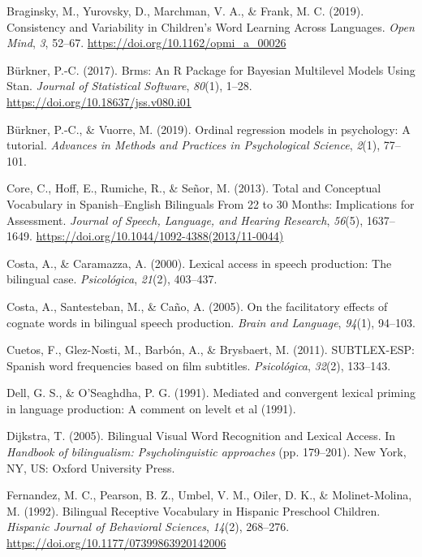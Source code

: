 \documentclass[
  english,
  man,man,floatsintext]{apa6}
\newlength{\cslhangindent}
\newenvironment{cslreferences}%
  {\setlength{\parindent}{0pt}%
  \everypar{\setlength{\hangindent}{\cslhangindent}}\ignorespaces}%
  {\par}
\begin{document}
\begin{cslreferences}
\leavevmode\hypertarget{ref-braginsky_consistency_2019}{}%
Braginsky, M., Yurovsky, D., Marchman, V. A., \& Frank, M. C. (2019). Consistency and Variability in Children's Word Learning Across Languages. \emph{Open Mind}, \emph{3}, 52--67. \url{https://doi.org/10.1162/opmi_a_00026}

\leavevmode\hypertarget{ref-burkner_brms_2017}{}%
Bürkner, P.-C. (2017). Brms: An R Package for Bayesian Multilevel Models Using Stan. \emph{Journal of Statistical Software}, \emph{80}(1), 1--28. \url{https://doi.org/10.18637/jss.v080.i01}

\leavevmode\hypertarget{ref-burkner_ordinal_2019}{}%
Bürkner, P.-C., \& Vuorre, M. (2019). Ordinal regression models in psychology: A tutorial. \emph{Advances in Methods and Practices in Psychological Science}, \emph{2}(1), 77--101.

\leavevmode\hypertarget{ref-core_total_2013}{}%
Core, C., Hoff, E., Rumiche, R., \& Señor, M. (2013). Total and Conceptual Vocabulary in Spanish--English Bilinguals From 22 to 30 Months: Implications for Assessment. \emph{Journal of Speech, Language, and Hearing Research}, \emph{56}(5), 1637--1649. \url{https://doi.org/10.1044/1092-4388(2013/11-0044)}

\leavevmode\hypertarget{ref-costa_lexical_2000}{}%
Costa, A., \& Caramazza, A. (2000). Lexical access in speech production: The bilingual case. \emph{Psicológica}, \emph{21}(2), 403--437.

\leavevmode\hypertarget{ref-costa_facilitatory_2005}{}%
Costa, A., Santesteban, M., \& Caño, A. (2005). On the facilitatory effects of cognate words in bilingual speech production. \emph{Brain and Language}, \emph{94}(1), 94--103.

\leavevmode\hypertarget{ref-cuetos_subtlex-esp_2011}{}%
Cuetos, F., Glez-Nosti, M., Barbón, A., \& Brysbaert, M. (2011). SUBTLEX-ESP: Spanish word frequencies based on film subtitles. \emph{Psicológica}, \emph{32}(2), 133--143.

\leavevmode\hypertarget{ref-dell_mediated_1991}{}%
Dell, G. S., \& O'Seaghdha, P. G. (1991). Mediated and convergent lexical priming in language production: A comment on levelt et al (1991).

\leavevmode\hypertarget{ref-dijkstra_bilingual_2005}{}%
Dijkstra, T. (2005). Bilingual Visual Word Recognition and Lexical Access. In \emph{Handbook of bilingualism: Psycholinguistic approaches} (pp. 179--201). New York, NY, US: Oxford University Press.

\leavevmode\hypertarget{ref-fernandez_bilingual_1992}{}%
Fernandez, M. C., Pearson, B. Z., Umbel, V. M., Oiler, D. K., \& Molinet-Molina, M. (1992). Bilingual Receptive Vocabulary in Hispanic Preschool Children. \emph{Hispanic Journal of Behavioral Sciences}, \emph{14}(2), 268--276. \url{https://doi.org/10.1177/07399863920142006}


\end{cslreferences}
\end{document}
